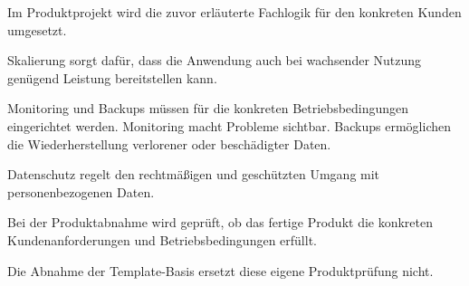 \begin{beginnerstatement}

Im Produktprojekt wird die zuvor erläuterte Fachlogik für den konkreten Kunden
umgesetzt.

Skalierung sorgt dafür, dass die Anwendung auch bei wachsender Nutzung genügend
Leistung bereitstellen kann.

Monitoring und Backups müssen für die konkreten Betriebsbedingungen
eingerichtet werden. Monitoring macht Probleme sichtbar. Backups ermöglichen
die Wiederherstellung verlorener oder beschädigter Daten.

Datenschutz regelt den rechtmäßigen und geschützten Umgang mit personenbezogenen
Daten.

Bei der Produktabnahme wird geprüft, ob das fertige Produkt die konkreten
Kundenanforderungen und Betriebsbedingungen erfüllt.

Die Abnahme der Template-Basis ersetzt diese eigene Produktprüfung nicht.

\end{beginnerstatement}
